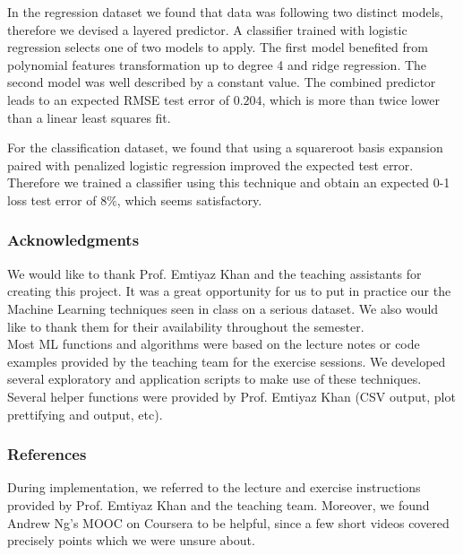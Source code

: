 \documentclass{article} %
\begin{document}
In the regression dataset we found that data was following two distinct models, therefore we devised a layered predictor. A classifier trained with logistic regression selects one of two models to apply. The first model benefited from polynomial features transformation up to degree 4 and ridge regression. The second model was well described by a constant value. The combined predictor leads to an expected RMSE test error of $0.204$, which is more than twice lower than a linear least squares fit.

For the classification dataset, we found that using a squareroot basis expansion paired with penalized logistic regression improved the expected test error. Therefore we trained a classifier using this technique and obtain an expected 0-1 loss test error of $8\%$, which seems satisfactory.

\subsubsection*{Acknowledgments}
  We would like to thank Prof. Emtiyaz Khan and the teaching assistants for creating this project. It was a great opportunity for us to put in practice our the Machine Learning techniques seen in class on a serious dataset. We also would like to thank them for their availability throughout the semester.\\
  Most ML functions and algorithms were based on the lecture notes or code examples provided by the teaching team for the exercise sessions. We developed several exploratory and application scripts to make use of these techniques. Several helper functions were provided by Prof. Emtiyaz Khan (CSV output, plot prettifying and output, etc).

\subsubsection*{References}
  During implementation, we referred to the lecture and exercise instructions provided by Prof. Emtiyaz Khan and the teaching team. Moreover, we found Andrew Ng's MOOC on Coursera to be helpful, since a few short videos covered precisely points which we were unsure about.
\end{document}
